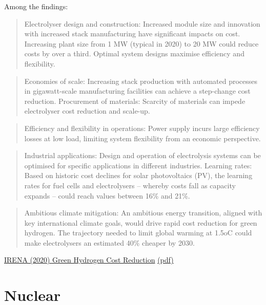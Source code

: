 \documentclass[
]{book}
\begin{document}
Among the findings:

\begin{quote}
Electrolyser design and construction: Increased module size and innovation with increased stack manufacturing have significant impacts on cost. Increasing plant size from 1 MW (typical in 2020) to 20 MW could reduce costs by over a third. Optimal system designs maximise efficiency and flexibility.
\end{quote}

\begin{quote}
Economies of scale: Increasing stack production with automated processes in gigawatt-scale manufacturing facilities can achieve a step-change cost reduction. Procurement of materials: Scarcity of materials can impede electrolyser cost reduction and scale-up.
\end{quote}

\begin{quote}
Efficiency and flexibility in operations: Power supply incurs large efficiency losses at low load, limiting system flexibility from an economic perspective.
\end{quote}

\begin{quote}
Industrial applications: Design and operation of electrolysis systems can be optimised for specific applications in different industries. Learning rates: Based on historic cost declines for solar photovoltaics (PV), the learning rates for fuel cells and electrolysers -- whereby costs fall as capacity expands -- could reach values between 16\% and 21\%.
\end{quote}

\begin{quote}
Ambitious climate mitigation: An ambitious energy transition, aligned with key international climate goals, would drive rapid cost reduction for green hydrogen. The trajectory needed to limit global warming at 1.5oC could make electrolysers an estimated 40\% cheaper by 2030.
\end{quote}

\href{https://www.irena.org/publications/2020/Dec/Green-hydrogen-cost-reduction}{IRENA (2020) Green Hydrogen Cost Reduction}
\href{pdf/IRENA_Green_hydrogen_cost_2020.pdf}{(pdf)}

\hypertarget{nuclear}{%
\chapter{Nuclear}\label{nuclear}}
\end{document}

